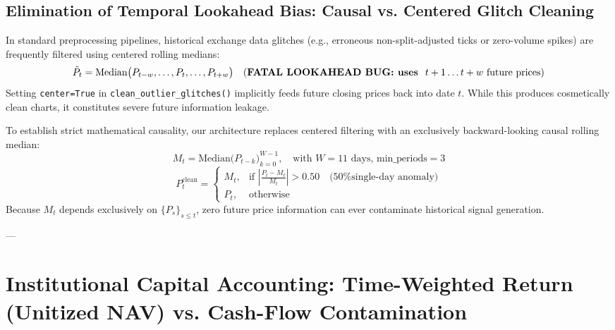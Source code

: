 \documentclass[11pt,a4paper]{article}
\begin{document}
\subsection{Elimination of Temporal Lookahead Bias: Causal vs. Centered Glitch Cleaning}
In standard preprocessing pipelines, historical exchange data glitches (e.g., erroneous non-split-adjusted ticks or zero-volume spikes) are frequently filtered using centered rolling medians:
\begin{equation}
\tilde{P}_t = \text{Median}\big(P_{t-w}, \dots, P_t, \dots, P_{t+w}\big) \quad \text{(\textbf{FATAL LOOKAHEAD BUG: uses } } t+1 \dots t+w \text{ future prices)}
\end{equation}
Setting \texttt{center=True} in \texttt{clean\_outlier\_glitches()} implicitly feeds future closing prices back into date $t$. While this produces cosmetically clean charts, it constitutes severe future information leakage.

To establish strict mathematical causality, our architecture replaces centered filtering with an exclusively backward-looking causal rolling median:
\begin{equation}
M_t = \text{Median}\big(P_{t-k}\big)_{k=0}^{W-1}, \quad \text{with } W = 11 \text{ days, min\_periods} = 3
\end{equation}
\begin{equation}
P_t^{\text{clean}} = 
\begin{cases}
M_t, & \text{if } \left| \frac{P_t - M_t}{M_t} \right| > 0.50 \quad \text{(50\% single-day anomaly)} \\
P_t, & \text{otherwise}
\end{cases}
\end{equation}
Because $M_t$ depends exclusively on $\{P_s\}_{s \le t}$, zero future price information can ever contaminate historical signal generation.

---

\section{Institutional Capital Accounting: Time-Weighted Return (Unitized NAV) vs. Cash-Flow Contamination}
\end{document}
